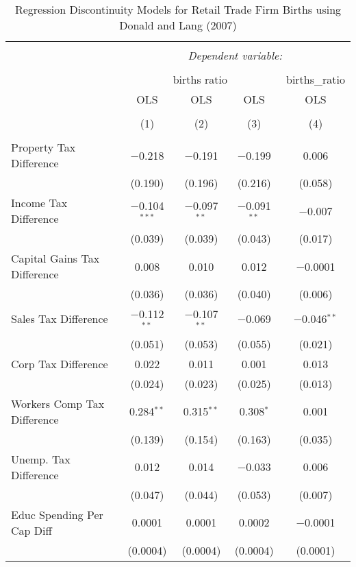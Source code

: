 
\begin{table}[!htbp] \centering 
  \caption{Regression Discontinuity Models for  Retail Trade Firm Births using Donald and Lang (2007)} 
  \label{} 
\begin{tabular}{@{\extracolsep{5pt}}lcccc} 
\\[-1.8ex]\hline 
\hline \\[-1.8ex] 
 & \multicolumn{4}{c}{\textit{Dependent variable:}} \\ 
\cline{2-5} 
\\[-1.8ex] & \multicolumn{3}{c}{births ratio} & births\_ratio \\ 
 & OLS & OLS & OLS & OLS \\ 
\\[-1.8ex] & (1) & (2) & (3) & (4)\\ 
\hline \\[-1.8ex] 
 Property Tax Difference & $-$0.218 & $-$0.191 & $-$0.199 & 0.006 \\ 
  & (0.190) & (0.196) & (0.216) & (0.058) \\ 
  Income Tax Difference & $-$0.104$^{***}$ & $-$0.097$^{**}$ & $-$0.091$^{**}$ & $-$0.007 \\ 
  & (0.039) & (0.039) & (0.043) & (0.017) \\ 
  Capital Gains Tax Difference & 0.008 & 0.010 & 0.012 & $-$0.0001 \\ 
  & (0.036) & (0.036) & (0.040) & (0.006) \\ 
  Sales Tax Difference & $-$0.112$^{**}$ & $-$0.107$^{**}$ & $-$0.069 & $-$0.046$^{**}$ \\ 
  & (0.051) & (0.053) & (0.055) & (0.021) \\ 
  Corp Tax Difference & 0.022 & 0.011 & 0.001 & 0.013 \\ 
  & (0.024) & (0.023) & (0.025) & (0.013) \\ 
  Workers Comp Tax Difference & 0.284$^{**}$ & 0.315$^{**}$ & 0.308$^{*}$ & 0.001 \\ 
  & (0.139) & (0.154) & (0.163) & (0.035) \\ 
  Unemp. Tax Difference & 0.012 & 0.014 & $-$0.033 & 0.006 \\ 
  & (0.047) & (0.044) & (0.053) & (0.007) \\ 
  Educ Spending Per Cap Diff & 0.0001 & 0.0001 & 0.0002 & $-$0.0001 \\ 
  & (0.0004) & (0.0004) & (0.0004) & (0.0001) \\ 

\end{tabular}
\end{table}
